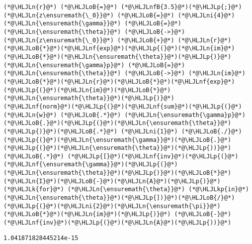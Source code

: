 \documentclass[12pt,a4paper]{article}
\newcommand{\HLJLk}[1]{\textcolor[RGB]{148,91,176}{\textbf{#1}}}
\newcommand{\HLJLkp}[1]{\textcolor[RGB]{148,91,176}{\textbf{#1}}}
\newcommand{\HLJLn}[1]{#1}
\newcommand{\HLJLnf}[1]{\textcolor[RGB]{66,102,213}{#1}}
\newcommand{\HLJLnfB}[1]{\textcolor[RGB]{59,151,46}{#1}}
\newcommand{\HLJLni}[1]{\textcolor[RGB]{59,151,46}{#1}}
\newcommand{\HLJLoB}[1]{\textcolor[RGB]{102,102,102}{\textbf{#1}}}
\newcommand{\HLJLp}[1]{#1}
\begin{document}
\begin{lstlisting}
(*@\HLJLn{r}@*) (*@\HLJLoB{=}@*) (*@\HLJLnfB{3.5}@*)(*@\HLJLp{;}@*) (*@\HLJLn{z\ensuremath{\_0}}@*) (*@\HLJLoB{=}@*) (*@\HLJLni{4}@*)
(*@\HLJLn{\ensuremath{\gamma}}@*) (*@\HLJLoB{=}@*) (*@\HLJLn{\ensuremath{\theta}}@*) (*@\HLJLoB{->}@*) (*@\HLJLn{z\ensuremath{\_0}}@*) (*@\HLJLoB{+}@*) (*@\HLJLn{r}@*)(*@\HLJLoB{*}@*)(*@\HLJLnf{exp}@*)(*@\HLJLp{(}@*)(*@\HLJLn{im}@*)(*@\HLJLoB{*}@*)(*@\HLJLn{\ensuremath{\theta}}@*)(*@\HLJLp{)}@*)
(*@\HLJLn{\ensuremath{\gamma}p}@*) (*@\HLJLoB{=}@*) (*@\HLJLn{\ensuremath{\theta}}@*) (*@\HLJLoB{->}@*) (*@\HLJLn{im}@*)(*@\HLJLoB{*}@*)(*@\HLJLn{r}@*)(*@\HLJLoB{*}@*)(*@\HLJLnf{exp}@*)(*@\HLJLp{(}@*)(*@\HLJLn{im}@*)(*@\HLJLoB{*}@*)(*@\HLJLn{\ensuremath{\theta}}@*)(*@\HLJLp{)}@*)
(*@\HLJLnf{norm}@*)(*@\HLJLp{(}@*)(*@\HLJLnf{sum}@*)(*@\HLJLp{(}@*)(*@\HLJLn{w}@*) (*@\HLJLoB{.*}@*) (*@\HLJLn{\ensuremath{\gamma}p}@*)(*@\HLJLoB{.}@*)(*@\HLJLp{(}@*)(*@\HLJLn{\ensuremath{\theta}}@*)(*@\HLJLp{)}@*)(*@\HLJLoB{.*}@*) (*@\HLJLni{1}@*) (*@\HLJLoB{./}@*)(*@\HLJLp{(}@*)(*@\HLJLn{\ensuremath{\gamma}}@*)(*@\HLJLoB{.}@*)(*@\HLJLp{(}@*)(*@\HLJLn{\ensuremath{\theta}}@*)(*@\HLJLp{))}@*) (*@\HLJLoB{.*}@*) (*@\HLJLp{[}@*)(*@\HLJLnf{inv}@*)(*@\HLJLp{(}@*)(*@\HLJLnf{\ensuremath{\gamma}}@*)(*@\HLJLp{(}@*)(*@\HLJLn{\ensuremath{\theta}}@*)(*@\HLJLp{)}@*)(*@\HLJLoB{*}@*)(*@\HLJLn{I}@*)(*@\HLJLoB{-}@*)(*@\HLJLn{A}@*)(*@\HLJLp{)}@*) (*@\HLJLk{for}@*) (*@\HLJLn{\ensuremath{\theta}}@*) (*@\HLJLkp{in}@*) (*@\HLJLn{\ensuremath{\theta}}@*)(*@\HLJLp{])}@*)(*@\HLJLoB{/}@*)(*@\HLJLp{(}@*)(*@\HLJLni{2}@*)(*@\HLJLn{\ensuremath{\pi}}@*)(*@\HLJLoB{*}@*)(*@\HLJLn{im}@*)(*@\HLJLp{)}@*) (*@\HLJLoB{-}@*) (*@\HLJLnf{inv}@*)(*@\HLJLp{(}@*)(*@\HLJLn{A}@*)(*@\HLJLp{))}@*)
\end{lstlisting}

\begin{lstlisting}
1.041871828445214e-15
\end{lstlisting}
\end{document}
